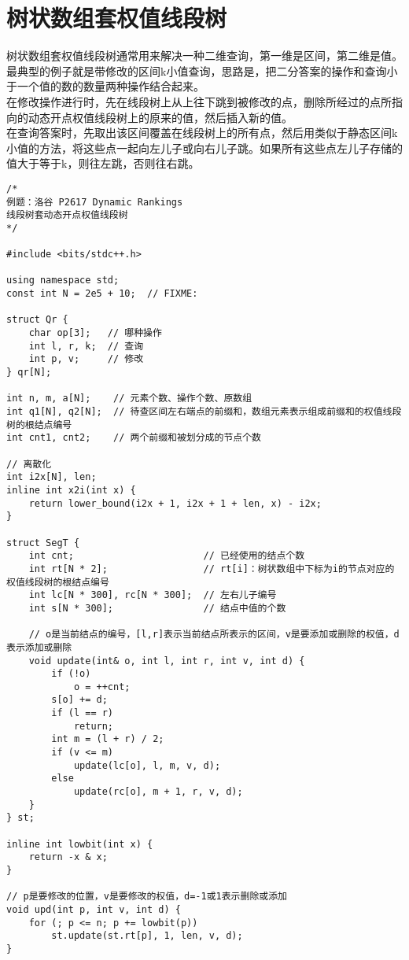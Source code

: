 \section{树状数组套权值线段树}
树状数组套权值线段树通常用来解决一种二维查询，第一维是区间，第二维是值。\\
最典型的例子就是带修改的区间k小值查询，思路是，把二分答案的操作和查询小于一个值的数的数量两种操作结合起来。\\
在修改操作进行时，先在线段树上从上往下跳到被修改的点，删除所经过的点所指向的动态开点权值线段树上的原来的值，然后插入新的值。\\
在查询答案时，先取出该区间覆盖在线段树上的所有点，然后用类似于静态区间k小值的方法，将这些点一起向左儿子或向右儿子跳。如果所有这些点左儿子存储的值大于等于k，则往左跳，否则往右跳。
\begin{lstlisting}
/*
例题：洛谷 P2617 Dynamic Rankings
线段树套动态开点权值线段树
*/

#include <bits/stdc++.h>

using namespace std;
const int N = 2e5 + 10;  // FIXME:

struct Qr {
    char op[3];   // 哪种操作
    int l, r, k;  // 查询
    int p, v;     // 修改
} qr[N];

int n, m, a[N];    // 元素个数、操作个数、原数组
int q1[N], q2[N];  // 待查区间左右端点的前缀和，数组元素表示组成前缀和的权值线段树的根结点编号
int cnt1, cnt2;    // 两个前缀和被划分成的节点个数

// 离散化
int i2x[N], len;
inline int x2i(int x) {
    return lower_bound(i2x + 1, i2x + 1 + len, x) - i2x;
}

struct SegT {
    int cnt;                       // 已经使用的结点个数
    int rt[N * 2];                 // rt[i]：树状数组中下标为i的节点对应的权值线段树的根结点编号
    int lc[N * 300], rc[N * 300];  // 左右儿子编号
    int s[N * 300];                // 结点中值的个数

    // o是当前结点的编号，[l,r]表示当前结点所表示的区间，v是要添加或删除的权值，d表示添加或删除
    void update(int& o, int l, int r, int v, int d) {
        if (!o)
            o = ++cnt;
        s[o] += d;
        if (l == r)
            return;
        int m = (l + r) / 2;
        if (v <= m)
            update(lc[o], l, m, v, d);
        else
            update(rc[o], m + 1, r, v, d);
    }
} st;

inline int lowbit(int x) {
    return -x & x;
}

// p是要修改的位置，v是要修改的权值，d=-1或1表示删除或添加
void upd(int p, int v, int d) {
    for (; p <= n; p += lowbit(p))
        st.update(st.rt[p], 1, len, v, d);
}


\end{lstlisting}
